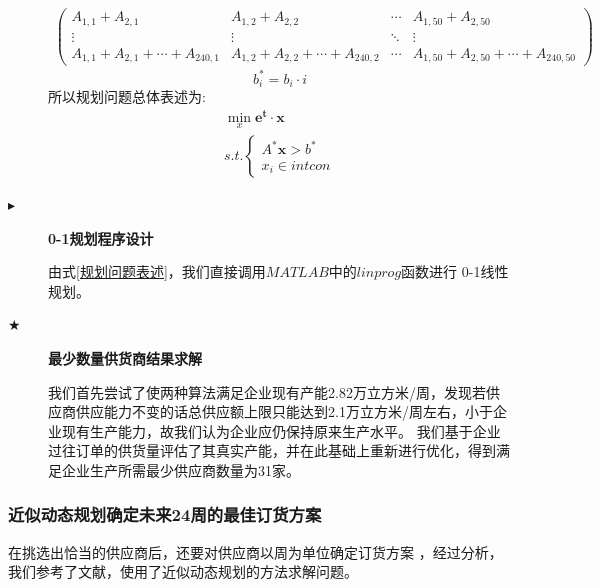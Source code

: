 \documentclass[withoutpreface,bwprint]{cumcmthesis}
\begin{document}
\begin{description}
{\begin{equation}
\begin{aligned}
\begin{pmatrix}
                    A_{1,1} + A_{2,1}                      & A_{1,2} + A_{2,2}                      & \cdots & A_{1,50} + A_{2,50}                       \\
                    \vdots                                 & \vdots                                 & \ddots & \vdots                                    \\
                    A_{1,1} + A_{2,1} + \cdots + A_{240,1} & A_{1,2} + A_{2,2} + \cdots + A_{240,2} & \cdots & A_{1,50} + A_{2,50} + \cdots + A_{240,50}
                \end{pmatrix} \nonumber
            \end{aligned}
        \end{equation}
        }
        \begin{equation}
            b^*_i = b_i \cdot i \nonumber
        \end{equation}
        所以规划问题总体表述为:
        \begin{equation}
            \begin{aligned}
                \min_x \bm{e^t}\cdot \bm{x} \\
                s.t. \left\{
                \begin{aligned}
                    A^*\bm{x} > b^* \\
                    x_i \in intcon
                \end{aligned}
                \right.
            \end{aligned} \label{规划问题表述}
        \end{equation}

    \item[$\blacktriangleright$] \textbf{0-1规划程序设计}\par
        由式\ref{规划问题表述}，我们直接调用$MATLAB$中的$linprog$函数进行
        0-1线性规划。
    \item[$\bigstar$] \textbf{最少数量供货商结果求解}\par
        我们首先尝试了使两种算法满足企业现有产能2.82万立方米/周，发现若供应商供应能力不变的话总供应额上限只能达到2.1万立方米/周左右，小于企业现有生产能力，故我们认为企业应仍保持原来生产水平。
        我们基于企业过往订单的供货量评估了其真实产能，并在此基础上重新进行优化，得到满足企业生产所需最少供应商数量为31家。


\end{description}
\subsubsection{近似动态规划确定未来24周的最佳订货方案}
在挑选出恰当的供应商后，还要对供应商以周为单位确定订货方案
，经过分析，我们参考了文献\cite{RN10}，使用了近似动态规划的方法求解问题。
\end{document}
